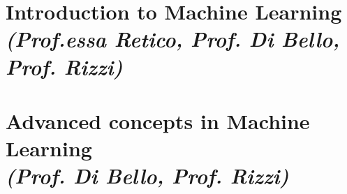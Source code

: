 \documentclass[a4paper, 11pt]{report}
\begin{document}







\chapter[Introduction to Machine Learning]{Introduction to Machine Learning \\[0.5ex] \large \textit{(Prof.essa Retico, Prof. Di Bello, Prof. Rizzi)}}










\chapter[Advanced concepts in Machine Learning]{Advanced concepts in Machine Learning \\[0.5ex] \large \textit{(Prof. Di Bello, Prof. Rizzi)}}










\end{document}
